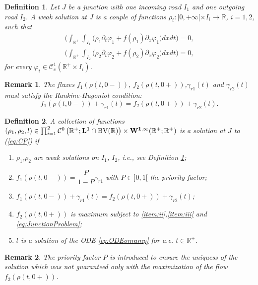 \documentclass[12pt,subeqn]{article}
\numberwithin{equation}{section}
\newtheorem{definition}{Definition}[section]
\newtheorem{remark}{Remark}
\newcommand{\R}{\mathbb R}
\newcommand{\BV}{\hbox{\textrm{BV}}}
\newcommand{\CC}{{\mathcal C}}
\newcommand{\del}{\partial}
\renewcommand{\L}[1]{\mathbf{L^#1}}
\begin{document}
\begin{definition}
	\label{def:weakSolRho}
	Let $J$ be a junction with one incoming road $I_1$ and one outgoing road $I_2$. A weak solution at $J$ is a couple of functions $\rho_i :[0,+\infty[ \times I_i \rightarrow \R$, $i=1,2$, such that 
	\begin{eqnarray}	
		\Big(\int_{\R^+}\int_{I_1}\Big( \rho_1 \del_t\varphi_1 +f(\rho_1)\del_x\varphi_1 \Big)dxdt\Big)=0, \nonumber \\
		\Big(\int_{\R^+}\int_{I_2}\Big( \rho_2 \del_t\varphi_2 +f(\rho_2)\del_x\varphi_2 \Big)dxdt\Big)=0,		
		\label{eq:weakSolRho}
	\end{eqnarray}
	for every $\varphi_i \in \CC^1_c(\R^+\times I_i)$. 
\end{definition}
\begin{remark}
	The fluxes $f_1(\rho(t,0-))$, $f_2(\rho(t,0+))$,$\gamma_{r1}(t)$ and $\gamma_{r2}(t)$ must satisfy the Rankine-Hugoniot condition:
	\begin{equation}
		f_1(\rho(t,0-))+\gamma_{r1}(t)=f_2(\rho(t,0+))+\gamma_{r2}(t).
		\label{eq:conservationAtJ}
	\end{equation}
\end{remark}
\begin{definition}
	\label{def:weak_sol}
	A collection of functions $(\rho_1,\rho_2,l)\in \prod_{i=1}^2 \CC^0\left( \R^+; \L1\cap\BV (\R)\right) \times \mathbf{W^{1,\infty}}(\R^+;\R^+)$ is a solution at $J$ to (\ref{eq:CP}) if
	\begin{enumerate}[label=(\roman{*}),ref=(\roman{*})]
		\item \label{item:i} $\rho_1$,$\rho_2$ are weak solutions on $I_1$, $I_2$, i.e., see Definition \ref{def:weakSolRho};
		\item \label{item:ii} $f_1(\rho(t,0-))=\dfrac{P}{1-P}\gamma_{r1}$ with $P \in ]0,1[$ the priority factor;
		\item \label{item:iii} $f_1(\rho(t,0-))+\gamma_{r1}(t)=f_2(\rho(t,0+))+\gamma_{r2}(t)$; 
		\item \label{item:iv} $f_2(\rho(t,0+))$ is maximum subject to \ref{item:ii},\ref{item:iii} and \eqref{eq:JunctionProblem};
		\item \label{item:v} $l$ is a solution of the ODE \eqref{eq:ODEonramp} for a.e. $t\in\R^+$.		
	\end{enumerate}
\end{definition}
\begin{remark}
	The priority factor $P$ is introduced to ensure the uniquess of the solution which was not guaranteed only with the maximization of the flow $f_2(\rho(t,0+))$.
\end{remark}
\end{document}
